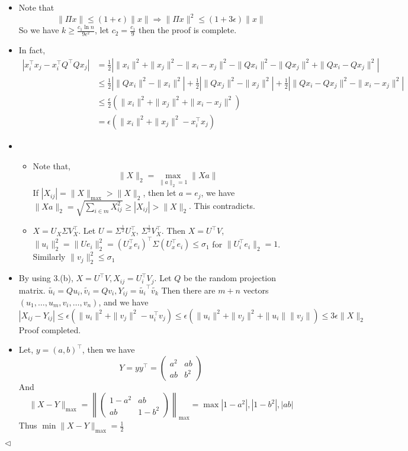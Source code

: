 \documentclass[11pt]{article}
\newenvironment{answer}[1][Answer]{\begin{trivlist}
\item[\hskip \labelsep {\bfseries #1.}\hskip \labelsep]}{\hfill$\lhd$\end{trivlist}}
\begin{document}
\begin{answer}
    \begin{itemize}
        \item [(1)] Note that 
        $$\|\Pi x\|\leq (1+\epsilon) \|x\| \Rightarrow \|\Pi x\|^2\leq (1+3\epsilon)\|x\|$$
        So we have $k\ge \frac{c_1\ln n}{9\epsilon^2}$, let $c_2 = \frac{c_1}{9}$ then the proof is complete.
        \item [(2)] In fact,
        $$\begin{align*}|x_i^\top x_j-x_i^\top Q^\top Qx_j|&=\frac{1}{2}|\|x_i\|^2+\|x_j\|^2-\|x_i-x_j\|^2-\|Qx_i\|^2-\|Qx_j\|^2+\|Qx_i-Qx_j\|^2|\\&\leq \frac{1}{2}|\|Qx_i\|^2-\|x_i\|^2|+\frac{1}{2}|\|Qx_j\|^2-\|x_j\|^2|+\frac{1}{2}|\|Qx_i-Qx_j\|^2-\|x_i-x_j\|^2|\\&\leq \frac{\epsilon}{2}(\|x_i\|^2+\|x_j\|^2+\|x_i-x_j\|^2)\\&=\epsilon (\|x_i\|^2+\|x_j\|^2-x_i^\top x_j)\end{align*}$$
        \item [(3)] 
        \begin{itemize}
            \item [(a)] Note that, 
$$\|X\|_2=\underset{\|a\|_2=1}{\max}\|Xa\|$$
If $|X_{ij}|=\|X\|_{\max}>\|X\|_2$, then let $a=e_j$, we have $\|Xa\|_2=\sqrt{\sum_{i\in m}X_{ij}^2}\ge |X_{ij}|>\|X\|_2$. This contradicts.
            \item [(b)] $X=U_X\Sigma V_X^\top$. Let $U=\Sigma^{\frac{1}{2}}U_X^\top$, $\Sigma^{\frac{1}{2}}V_X^\top$.
Then $X=U^\top V$, $\|u_i\|_2^2=\|Ue_i\|_2^2=(U_x^\top e_i)^\top\Sigma (U_x^\top e_i)\leq \sigma_1$ for $\|U_i^\top e_i\|_2=1$. Similarly $\|v_j\|_2^2\leq \sigma_1$
        \end{itemize}
        \item [(4)]
        By using 3.(b), $X=U^\top V,X_{ij}=U_i^\top V_j$. Let $Q$ be the random projection matrix. $\tilde{u_i}=Qu_i,\tilde{v_i}=Qv_i, Y_{ij}=\tilde{u_i}^\top\tilde{v_k}$
        Then there are $m+n$ vectors $(u_1,\dots,u_m,v_i,\dots,v_n)$, and we have
        $$|X_{ij}-Y_{ij}|\leq \epsilon (\|u_i\|^2+\|v_j\|^2-u_i^\top v_j)\leq \epsilon (\|u_i\|^2+\|v_j\|^2+\|u_i\|\|v_j\|)\leq 3\epsilon \|X\|_2$$
        Proof completed.
        \item [(5)]
        Let, $y=(a,b)^\top$, then we have $$Y=yy^\top = \begin{pmatrix}
            a^2 & ab\\ab & b^2
        \end{pmatrix}$$
        And $$\|X-Y\|_{\max} = \left\|\begin{pmatrix}
            1-a^2 & ab\\ab &1-b^2
        \end{pmatrix}\right\|_{\max} = \max{|1-a^2|,|1-b^2|,|ab|}$$
        Thus $\min \|X-Y\|_{\max} = \frac{1}{2}$
    \end{itemize}
\end{answer}
\end{document}
